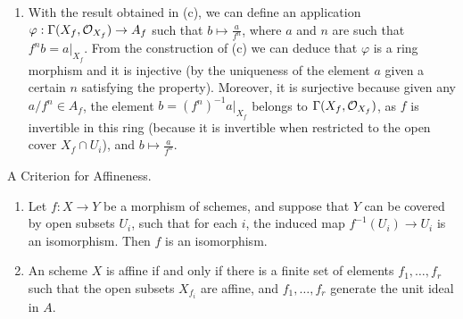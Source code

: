 \begin{sol}
\begin{enumerate}[label=\alph*)]
		\item With the result obtained in (c), we can define an application $\varphi: \Gamma(X_f, \mathcal{O}_{X_f}) \to A_f$ such that $b \mapsto \frac{a}{f^n}$, where $a$ and $n$ are such that $f^nb = a|_{X_f}$. From the construction of (c) we can deduce that $\varphi$ is a ring morphism and it is injective (by the uniqueness of the element $a$ given a certain $n$ satisfying the property). Moreover, it is surjective because given any $a/f^n \in A_f$, the element $b = (f^n)^{-1}a|_{X_f}$ belongs to $\Gamma(X_f, \mathcal{O}_{X_f})$, as $f$ is invertible in this ring (because it is invertible when restricted to the open cover $X_f \cap U_i$), and $b \mapsto \frac{a}{f^n}$.
	\end{enumerate}
\end{sol}

\begin{ex}
	A Criterion for Affineness.
	\begin{enumerate}[label=\alph*)]
		\item Let $f: X \to Y$ be a morphism of schemes, and suppose that $Y$ can be covered by open subsets $U_i$, such that for each $i$, the induced map $f^{-1}(U_i) \to U_i$ is an isomorphism. Then $f$ is an isomorphism.

		\item An scheme $X$ is affine if and only if there is a finite set of elements $f_1, \dots, f_r$ such that the open subsets $X_{f_i}$ are affine, and $f_1, \dots, f_r$ generate the unit ideal in $A$.
	\end{enumerate}
\end{ex}

